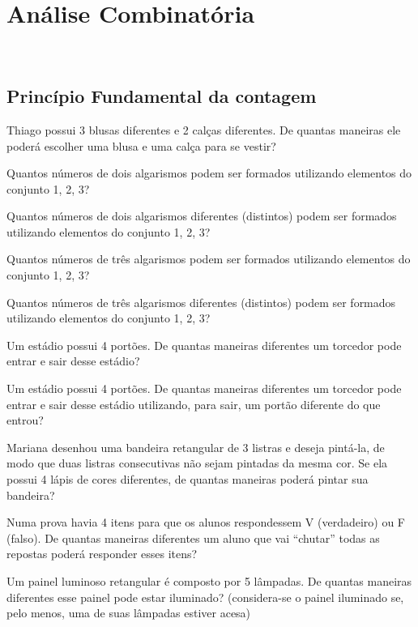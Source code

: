 \chapter{Análise Combinatória} \
		\section{Princípio Fundamental da contagem}
		
		
		\item Thiago possui 3 blusas diferentes e 2 calças diferentes. De quantas maneiras ele poderá escolher uma blusa e uma calça para se vestir?
		
		\item Quantos números de dois algarismos podem ser formados utilizando elementos do conjunto  {1, 2, 3}?
		
		\item Quantos números de dois algarismos diferentes (distintos) podem ser formados utilizando elementos do conjunto {1, 2, 3}?
		
		\item Quantos números de três algarismos podem ser formados utilizando elementos do conjunto {1, 2, 3}?

		\item Quantos números de três algarismos diferentes (distintos) podem ser formados utilizando elementos do conjunto {1, 2, 3}?

		\item Um estádio possui 4 portões. De quantas maneiras diferentes um torcedor pode entrar e sair desse estádio? 
		
		\item Um estádio possui 4 portões. De quantas maneiras diferentes um torcedor pode entrar e sair desse estádio utilizando, para sair, um portão diferente do que entrou? 
		
		\item Mariana desenhou uma bandeira retangular de 3 listras e deseja pintá-la, de modo que duas listras consecutivas não sejam pintadas da mesma cor. Se ela possui 4 lápis de cores diferentes, de quantas maneiras poderá pintar sua bandeira? 
		
		\item Numa prova havia 4 itens para que os alunos respondessem V (verdadeiro) ou F (falso). De quantas maneiras diferentes um aluno que vai “chutar” todas as repostas poderá responder esses itens? 
		
		\item Um painel luminoso retangular é composto por 5 lâmpadas. De quantas maneiras diferentes esse painel pode estar iluminado? (considera-se o painel iluminado se, pelo menos, uma de suas lâmpadas estiver acesa) 
		
